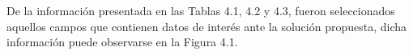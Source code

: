 








De la información presentada en las Tablas 4.1, 4.2 y 4.3, fueron seleccionados aquellos campos que contienen datos de interés ante la solución propuesta, dicha información puede observarse en la Figura 4.1. \\

